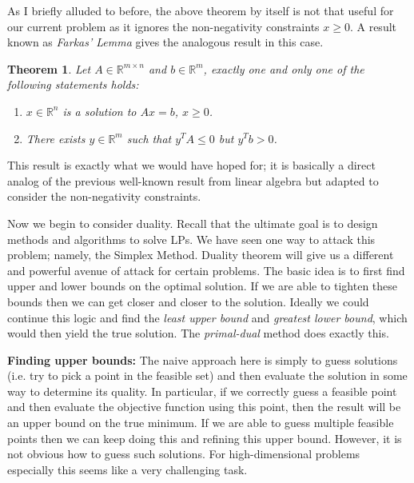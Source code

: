 \documentclass[12pt]{article}
\newcommand{\R}{\mathcal{R}}
\def\R{\mathbb{R}}
\newtheorem{thm}{Theorem}
\begin{document}
As I briefly alluded to before, the above theorem by itself is not that useful for our current problem as it ignores the non-negativity constraints $x \geq 0$. A result known as \textit{Farkas' Lemma}
gives the analogous result in this case. 
\begin{thm}
Let $A \in \R^{m \times n}$ and $b \in \R^m$, exactly one and only one of the following statements holds: 
\begin{enumerate}
\item $x \in \R^n$ is a solution to $Ax = b$, $x \geq 0$.
\item There exists $y \in \R^m$ such that $y^T A \leq 0$ but $y^T b > 0$. 
\end{enumerate}
\end{thm}
This result is exactly what we would have hoped for; it is basically a direct analog of the previous well-known result from linear algebra but adapted to consider the non-negativity constraints. 

Now we begin to consider duality. Recall that the ultimate goal is to design methods and algorithms to solve LPs. We have seen one way to attack this problem; namely, the Simplex Method. 
Duality theorem will give us a different and powerful avenue of attack for certain problems. The basic idea is to first find upper and lower bounds on the optimal solution. If we are able to tighten 
these bounds then we can get closer and closer to the solution. Ideally we could continue this logic and find the \textit{least upper bound} and \textit{greatest lower bound}, which would then yield
the true solution. The \textit{primal-dual} method does exactly this. 

\bigskip

\textbf{Finding upper bounds:} The naive approach here is simply to guess solutions (i.e. try to pick a point in the feasible set) and then evaluate the solution in some way to determine its 
quality. In particular, if we correctly guess a feasible point and then evaluate the objective function using this point, then the result will be an upper bound on the true minimum. If we are able 
to guess multiple feasible points then we can keep doing this and refining this upper bound. However, it is not obvious how to guess such solutions. For high-dimensional problems especially
this seems like a very challenging task. 

\bigskip
\end{document}
